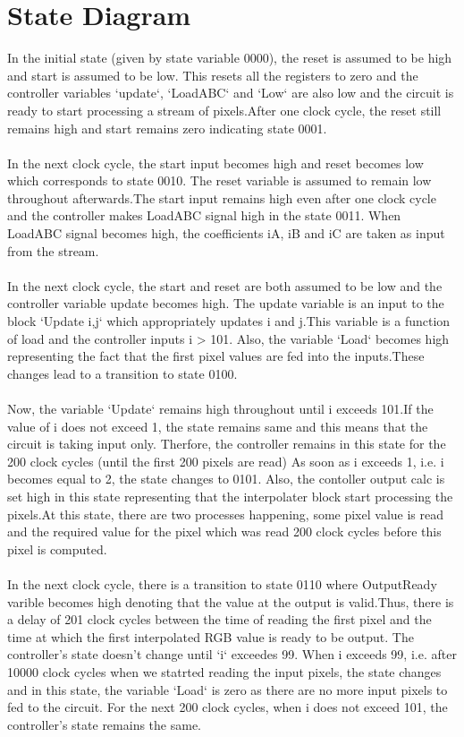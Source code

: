\documentclass[a4paper,12pt]{article}
\begin{document}
\vspace*{-2.5cm}
\section{State Diagram}

In the initial state (given by state variable 0000), the reset is assumed to be high and start is assumed to be low.
This resets all the registers to zero and the controller variables `update`, `LoadABC` and `Low` are also low and the circuit is ready to start processing a stream of pixels.After one clock cycle, the reset still remains high and start remains zero indicating state 0001.\\\\
In the next clock cycle, the start input becomes high and reset becomes low which corresponds to state 0010.
The reset variable is assumed to remain low throughout afterwards.The start input remains high even after one clock cycle and the controller makes LoadABC signal high in the state 0011. When LoadABC signal becomes high, the coefficients iA, iB and iC are taken as input from the stream.\\\\
In the next clock cycle, the start and reset are both assumed to be low and the controller variable update becomes high. The update variable is an input to the block `Update i,j` which appropriately updates i and j.This variable is a function of load and the controller inputs i > 101. Also, the variable `Load` becomes high representing the fact that the first pixel values are fed into the inputs.These changes lead to a transition to state 0100.\\\\
Now, the variable `Update` remains high throughout until i exceeds 101.If the value of i does not exceed 1, the state remains same and this means that the circuit is taking input only. Therfore, the controller remains in this state for the 200 clock cycles (until the first 200 pixels are read) As soon as i exceeds 1, i.e. i becomes equal to 2, the state changes to 0101. Also, the contoller output calc is set high in this state representing that the interpolater block start processing the pixels.At this state, there are two processes happening, some pixel value is read and the required value for the pixel which was read 200 clock cycles before this pixel is computed.\\\\
In the next clock cycle, there is a transition to state 0110 where OutputReady varible becomes high denoting that the value at the output is valid.Thus, there is a delay of 201 clock cycles between the time of reading the first pixel and the time at which the first interpolated RGB value is ready to be output. The controller's state doesn't change until `i` exceedes 99. When i exceeds 99, i.e. after 10000 clock cycles when we statrted reading the input pixels, the state changes and in this state, the variable `Load` is zero as there are no more input pixels to fed to the circuit. For the next 200 clock cycles, when i does not exceed 101, the controller's state remains the same.\\\\
\end{document}

